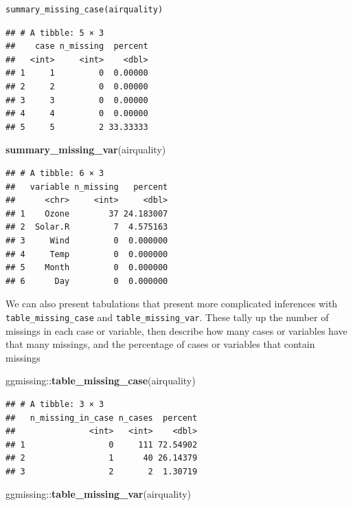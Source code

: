 \documentclass[]{article}
\newenvironment{Shaded}{\begin{snugshade}}{\end{snugshade}}
\newcommand{\KeywordTok}[1]{\textcolor[rgb]{0.13,0.29,0.53}{\textbf{{#1}}}}
\newcommand{\NormalTok}[1]{{#1}}
\begin{document}
\begin{verbatim}
summary_missing_case(airquality)
\end{verbatim}

\begin{verbatim}
## # A tibble: 5 × 3
##    case n_missing  percent
##   <int>     <int>    <dbl>
## 1     1         0  0.00000
## 2     2         0  0.00000
## 3     3         0  0.00000
## 4     4         0  0.00000
## 5     5         2 33.33333
\end{verbatim}

\begin{Shaded}
\begin{Highlighting}[]
\KeywordTok{summary_missing_var}\NormalTok{(airquality)}
\end{Highlighting}
\end{Shaded}

\begin{verbatim}
## # A tibble: 6 × 3
##   variable n_missing   percent
##      <chr>     <int>     <dbl>
## 1    Ozone        37 24.183007
## 2  Solar.R         7  4.575163
## 3     Wind         0  0.000000
## 4     Temp         0  0.000000
## 5    Month         0  0.000000
## 6      Day         0  0.000000
\end{verbatim}

We can also present tabulations that present more complicated inferences
with \texttt{table\_missing\_case} and \texttt{table\_missing\_var}.
These tally up the number of missings in each case or variable, then
describe how many cases or variables have that many missings, and the
percentage of cases or variables that contain missings

\begin{Shaded}
\begin{Highlighting}[]
\NormalTok{ggmissing::}\KeywordTok{table_missing_case}\NormalTok{(airquality)}
\end{Highlighting}
\end{Shaded}

\begin{verbatim}
## # A tibble: 3 × 3
##   n_missing_in_case n_cases  percent
##               <int>   <int>    <dbl>
## 1                 0     111 72.54902
## 2                 1      40 26.14379
## 3                 2       2  1.30719
\end{verbatim}

\begin{Shaded}
\begin{Highlighting}[]
\NormalTok{ggmissing::}\KeywordTok{table_missing_var}\NormalTok{(airquality)}
\end{Highlighting}
\end{Shaded}
\end{document}
